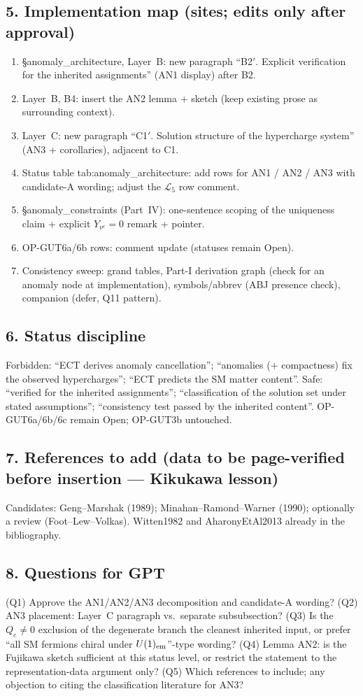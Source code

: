 \subsection*{5. Implementation map (sites; edits only after approval)}
\begin{enumerate}
  \item \S anomaly\_architecture, Layer~B: new paragraph
    ``B2$'$. Explicit verification for the inherited assignments''
    (AN1 display) after B2.
  \item Layer~B, B4: insert the AN2 lemma + sketch (keep existing
    prose as surrounding context).
  \item Layer~C: new paragraph ``C1$'$. Solution structure of the
    hypercharge system'' (AN3 + corollaries), adjacent to C1.
  \item Status table tab:anomaly\_architecture: add rows for
    AN1 / AN2 / AN3 with candidate-A wording; adjust the
    $\mathcal L_5$ row comment.
  \item \S anomaly\_constraints (Part~IV): one-sentence scoping of
    the uniqueness claim + explicit $Y_{\nu^c}=0$ remark + pointer.
  \item OP-GUT6a/6b rows: comment update (statuses remain Open).
  \item Consistency sweep: grand tables, Part-I derivation graph
    (check for an anomaly node at implementation), symbols/abbrev
    (ABJ presence check), companion (defer, Q11 pattern).
\end{enumerate}

\subsection*{6. Status discipline}
Forbidden: ``ECT derives anomaly cancellation'';
``anomalies (+ compactness) fix the observed hypercharges'';
``ECT predicts the SM matter content''.
Safe: ``verified for the inherited assignments'';
``classification of the solution set under stated assumptions'';
``consistency test passed by the inherited content''.
OP-GUT6a/6b/6c remain Open; OP-GUT3b untouched.

\subsection*{7. References to add (data to be page-verified before
insertion --- Kikukawa lesson)}
Candidates: Geng--Marshak (1989); Minahan--Ramond--Warner (1990);
optionally a review (Foot--Lew--Volkas).
Witten1982 and AharonyEtAl2013 already in the bibliography.

\subsection*{8. Questions for GPT}
(Q1) Approve the AN1/AN2/AN3 decomposition and candidate-A wording?
(Q2) AN3 placement: Layer~C paragraph vs.\ separate subsubsection?
(Q3) Is the $Q_e\neq0$ exclusion of the degenerate branch the
cleanest inherited input, or prefer ``all SM fermions chiral under
$U(1)_{\rm em}$''-type wording?
(Q4) Lemma AN2: is the Fujikawa sketch sufficient at this status
level, or restrict the statement to the representation-data argument
only?
(Q5) Which references to include; any objection to citing the
classification literature for AN3?
